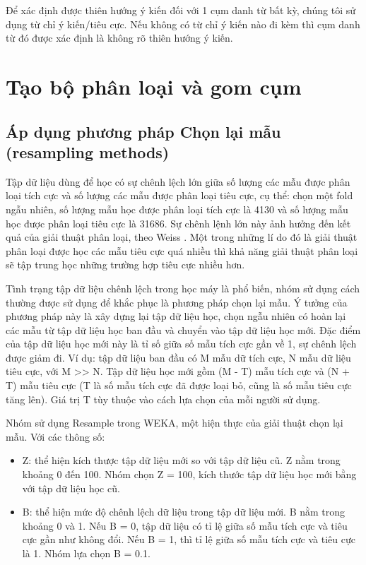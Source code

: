 \documentclass[12pt]{report}
\begin{document}
					\par Để xác định được thiên hướng ý kiến đối với 1 cụm danh từ bất kỳ, chúng tôi sử dụng từ chỉ ý kiến/tiêu cực. Nếu không có từ chỉ ý kiến nào đi kèm thì cụm danh từ đó được xác định là không rõ thiên hướng ý kiến.

		\section{Tạo bộ phân loại và gom cụm}									
			\subsection*{Áp dụng phương pháp Chọn lại mẫu (resampling methods)}
				\par Tập dữ liệu dùng để học có sự chênh lệch lớn giữa số lượng các mẫu được phân loại tích cực và số lượng các mẫu được phân loại tiêu cực, cụ thể: chọn một fold ngẫu nhiên, số lượng mẫu học được phân loại tích cực là 4130 và số lượng mẫu học được phân loại tiêu cực là 31686. Sự chênh lệnh lớn này ảnh hưởng đến kết quả của giải thuật phân loại, theo Weiss \cite{weiss03}. Một trong những lí do đó là giải thuật phân loại được học các mẫu tiêu cực quá nhiều thì khả năng giải thuật phân loại sẽ tập trung học những trường hợp tiêu cực nhiều hơn.
				\par Tình trạng tập dữ liệu chênh lệch trong học máy là phổ biến, nhóm sử dụng cách thường được sử dụng để khắc phục là phương pháp chọn lại mẫu. Ý tưởng của phương pháp này là xây dựng lại tập dữ liệu học, chọn ngẫu nhiên có hoàn lại các mẫu từ tập dữ liệu học ban đầu và chuyển vào tập dữ liệu học mới. Đặc điểm của tập dữ liệu học mới này là tỉ số giữa số mẫu tích cực gần về 1, sự chênh lệch được giảm đi. Ví dụ: tập dữ liệu ban đầu có M mẫu dữ tích cực, N mẫu dữ liệu tiêu cực, với M >> N. Tập dữ liệu học mới gồm (M - T) mẫu tích cực và (N + T) mẫu tiêu cực (T là số mẫu tích cực đã được loại bỏ, cũng là số mẫu tiêu cực tăng lên). Giá trị T tùy thuộc vào cách lựa chọn của mỗi người sử dụng.
				\par Nhóm sử dụng Resample trong WEKA, một hiện thực của giải thuật chọn lại mẫu. Với các thông số:
				\begin{itemize}
					\item{Z: thể hiện kích thược tập dữ liệu mới so với tập dữ liệu cũ. Z nằm trong khoảng 0 đến 100. Nhóm chọn Z = 100, kích thước tập dữ liệu học mới bằng với tập dữ liệu học cũ.}
					\item{B: thể hiện mức độ chênh lệch dữ liệu trong tập dữ liệu mới. B nằm trong khoảng 0 và 1. Nếu B = 0, tập dữ liệu có tỉ lệ giữa số mẫu tích cực và tiêu cực gần như không đổi. Nếu B = 1, thì tỉ lệ giữa số mẫu tích cực và tiêu cực là 1. Nhóm lựa chọn B = 0.1.}
				\end{itemize}
\end{document}
